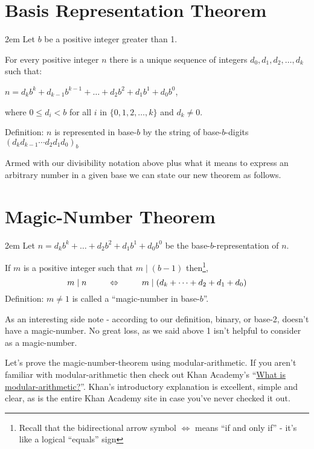 \documentclass{article}
\newenvironment{jprIn}{\begin{adjustwidth}{2em}{}}{\end{adjustwidth}}
\begin{document}
\section*{Basis Representation Theorem}
\begin{jprIn}
Let $b$ be a positive integer greater than 1.

For every positive integer $n$ there is a unique sequence
of integers $d_0, d_1, d_2,\dots{},d_k$ such that:

\hspace{3em}$n=d_kb^k+d_{k-1}b^{k-1}+\dots+d_2b^2+d_1b^1+d_0b^0$,

where $0\le{}d_i<b$ for all $i$ in $\{0,1,2,\dots{},k\}$ and $d_k\ne0$.

Definition: $n$ is represented in base-$b$ by the string
of base-$b$-digits $(d_kd_{k-1}{\cdots}d_2d_1d_0)_b$
\end{jprIn}

\bigskip
Armed with our divisibility notation above plus what it means to
express an arbitrary number in a given base we can state our new theorem as follows.
\section*{Magic-Number Theorem}
\begin{jprIn}
Let
$n=d_kb^k+\dots+d_2b^2+d_1b^1+d_0b^0$
be the base-$b$-representation of $n$.

If $m$ is a positive integer such that $m\mid{}(b-1)$ then\footnote{Recall that the 
bidirectional arrow symbol $\Leftrightarrow$
means ``if and only if'' - it's like a logical ``equals'' sign},
\[m\mid{}n \text{\hspace{2.5em}} \Leftrightarrow \text{\hspace{2.5em}}m\mid{}(d_k+\dots+d_2+d_1+d_0)\]
Definition: $m\ne1$ is called a ``magic-number in base-$b$''.
\end{jprIn}
\bigskip

As an interesting side note - according to our definition, binary,
or base-2, doesn't have a magic-number.
No great loss, as we said above 1 isn't helpful to consider as a magic-number. 

Let's prove the magic-number-theorem using 
modular-arithmetic. If you aren't familiar with modular-arithmetic
then check out Khan Academy's
``\href{https://www.khanacademy.org/computing/computer-science/cryptography/modarithmetic/a/what-is-modular-arithmetic}{What is modular-arithmetic?}''.
Khan's introductory explanation is excellent, simple and clear,
as is the entire Khan Academy site in case you've never checked it out.
\end{document}
